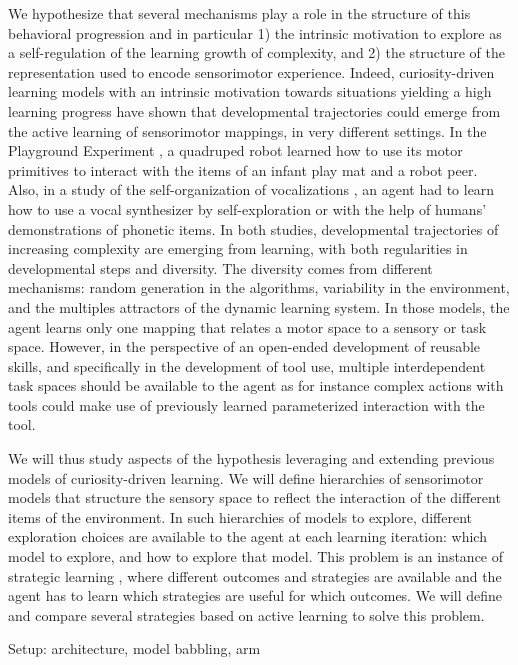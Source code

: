 \documentclass[10pt,letterpaper]{article}
\begin{document}
	We hypothesize that several mechanisms play a role in the structure of this behavioral progression and in particular 
	1) the intrinsic motivation to explore as a self-regulation of the learning growth of complexity, and 
	2) the structure of the representation used to encode sensorimotor experience.	
	Indeed, curiosity-driven learning models with an intrinsic motivation towards situations yielding a high learning progress 
	have shown that developmental trajectories could emerge from the active learning of sensorimotor mappings, in very different settings.
	In the Playground Experiment \cite{oudeyer_what_2007}, a quadruped robot learned how to use its motor primitives to interact with the items of an infant play mat and a robot peer.
	Also, in a study of the self-organization of vocalizations \cite{moulin-frier_self-organization_2014}, an agent had to learn how to
	use a vocal synthesizer by self-exploration or with the help of humans' demonstrations of phonetic items. 
	In both studies, developmental trajectories of increasing complexity are emerging from learning, with both regularities in developmental steps and diversity.
	The diversity comes from different mechanisms: random generation in the algorithms, variability in the environment, and the multiples attractors of the dynamic learning system.
	In those models, the agent learns only one mapping that relates a motor space to a sensory or task space. 
	However, in the perspective of an open-ended development of reusable skills, and specifically in the development of tool use, multiple interdependent task spaces should be available to the agent
	as for instance complex actions with tools could make use of previously learned parameterized interaction with the tool.
	
	We will thus study aspects of the hypothesis leveraging and extending previous models of curiosity-driven learning.
	We will define hierarchies of sensorimotor models that structure the sensory space to reflect the interaction of the different items of the environment.
	In such hierarchies of models to explore, different exploration choices are available to the agent at each learning iteration: which model to explore, and how to explore that model.
	This problem is an instance of strategic learning \cite{nguyen2012}, 
	where different outcomes and strategies are available and the agent has to learn which strategies are useful for which outcomes. 
	We will define and compare several strategies based on active learning to solve this problem.
	
	Setup: architecture, model babbling, arm
	
\end{document}
